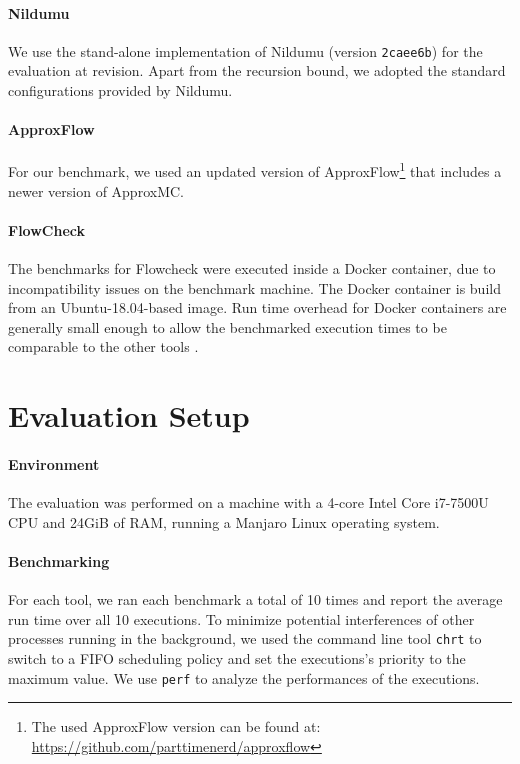 \paragraph{Nildumu}
We use the stand-alone implementation of Nildumu (version \texttt{2caee6b}) for the evaluation at revision. Apart from the recursion bound, we adopted the standard configurations provided by Nildumu.

\paragraph{ApproxFlow}
For our benchmark, we used an updated version of ApproxFlow\footnote{The used ApproxFlow version can be found at: \url{https://github.com/parttimenerd/approxflow}} that includes a newer version of ApproxMC.

\paragraph{FlowCheck}
The benchmarks for Flowcheck were executed inside a Docker container, due to incompatibility issues on the benchmark machine. The Docker container is build from an Ubuntu-18.04-based image. Run time overhead for Docker containers are generally small enough to allow the benchmarked execution times to be comparable to the other tools \cite{docker}.

\section{Evaluation Setup}

\paragraph{Environment}
The evaluation was performed on a machine with a 4-core Intel Core i7-7500U CPU and 24GiB of RAM, running a Manjaro Linux operating system.

\paragraph{Benchmarking}
For each tool, we ran each benchmark a total of 10 times and report the average run time over all 10 executions. To minimize potential interferences of other processes running in the background, we used the command line tool \texttt{chrt} to switch to a FIFO scheduling policy and set the executions's priority to the maximum value.
We use \texttt{perf} to analyze the performances of the executions.

